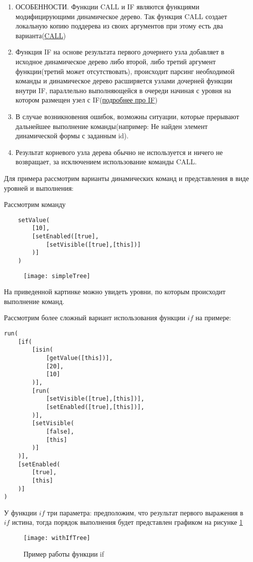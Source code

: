\documentclass[../index.tex]{subfiles}
\begin{document}
\begin{enumerate}
    \item ОСОБЕННОСТИ. Функции CALL и IF являются функциями модифицирующими динамическое дерево. Так функция CALL создает локальную копию поддерева из своих аргументов при этому есть два варианта(\hyperref[sec:fcall]{CALL})
    \item Функция IF на основе результата первого дочернего узла добавляет в исходное динамическое дерево либо второй, либо третий аргумент функции(третий может отсутствовать), происходит парсинг необходимой команды и динамическое дерево расширяется узлами дочерней функции внутри IF, параллельно выполняющейся в очереди начиная с уровня на котором размещен узел с IF(\hyperref[sec:fif]{подробнее про IF})
    \item В случае возникновения ошибок, возможны ситуации, которые прерывают дальнейшее выполнение команды(например: Не найден элемент динамической формы с заданным id).
    \item Результат корневого узла дерева обычно не используется и ничего не возвращает, за исключением  использование команды CALL.
\end{enumerate}
Для примера рассмотрим варианты динамических команд и представления в виде уровней и выполнения:

Рассмотрим команду 
\begin{verbatim}
    setValue(
        [10],
        [setEnabled([true],
            [setVisible([true],[this])]
        )]
    )
\end{verbatim}

\begin{figure}[h]
	\texttt{[image: simpleTree]}
	\centering
\end{figure}
На приведенной картинке можно увидеть уровни, по которым происходит выполнение команд. 

Рассмотрим более сложный вариант использования функции $if$ на примере:

\begin{verbatim}
run(
    [if(
        [isin(
            [getValue([this])],
            [20],
            [10]
        )],
        [run(
            [setVisible([true],[this])],
            [setEnabled([true],[this])],
        )],
        [setVisible(
            [false],
            [this]
        )]
    )],
    [setEnabled(
        [true],
        [this]
    )]
)
\end{verbatim}

У функции $if$ три параметра: предположим, что результат первого выражения в $if$ истина, тогда порядок выполнения будет представлен графиком на рисунке \ref{fig:if}
\begin{figure}[h]
	\texttt{[image: withIfTree]}
	\centering
	\caption{Пример работы функции if}
	\label{fig:if}
\end{figure}
\end{document}

